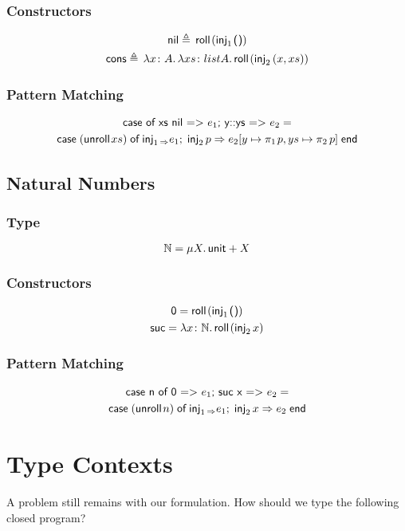 \documentclass{lecturenotes}
\newcommand{\tabs}[3]{\ensuremath{\lambda #1 \colon #2.\,#3}}
\newcommand{\utype}{\textsf{unit}\xspace}
\newcommand{\unit}{\ensuremath{\textsf{(}\mkern0.5mu\textsf{)}}}
\newcommand{\pair}[2]{\ensuremath{(#1, #2)}}
\newcommand{\projl}[1]{\ensuremath{\pi_1\mkern2mu#1}}
\newcommand{\projr}[1]{\ensuremath{\pi_2\mkern3mu#1}}
\newcommand{\sumtype}[2]{\ensuremath{#1 + #2}}
\newcommand{\injl}[1]{\ensuremath{\textsf{inj}_1\mkern2mu#1}}
\newcommand{\injr}[1]{\ensuremath{\textsf{inj}_2\mkern3mu#1}}
\newcommand{\case}[5]{\ensuremath{\textsf{case}\mkern5mu#1\mkern5mu\textsf{of}\mkern5mu\injl{#2} \Rightarrow #3;\mkern5mu\injr{#4} \Rightarrow #5\mkern5mu\textsf{end}}}
\newcommand{\rectype}[2]{\ensuremath{\mu #1.\,#2}}
\newcommand{\roll}[1]{\textsf{roll}\mkern2mu#1}
\newcommand{\unroll}[1]{\textsf{unroll}\mkern2mu#1}
\begin{document}
\subsubsection{Constructors}
\begin{gather*}
  \textsf{nil} \triangleq\, \roll{(\injl{\unit})}\\
  \textsf{cons} \triangleq\, \tabs{x}{A}{\tabs{xs}{list A}{\roll{(\injr{\pair{x}{xs}})}}}
\end{gather*}

\subsubsection{Pattern Matching}

\begin{gather*}
  \textsf{case of xs nil => $e_1$; y::ys => $e_2$} =\\
  \textsf{\case{(\unroll{xs})}{_}{e_1}{p}{e_2[y \mapsto \projl{p}, ys \mapsto \projr{p}]}}
\end{gather*}

\subsection{Natural Numbers}
\subsubsection{Type}

\[
  \mathbb{N} = \textsf{\rectype{X}{\sumtype{\utype}{X}}}
\]

\subsubsection{Constructors}
\begin{gather*}
  \textsf{0} = \roll{(\injl{\unit})}\\
  \textsf{suc} = \tabs{x}{\mathbb{N}}{\roll{(\injr{x})}}
\end{gather*}

\subsubsection{Pattern Matching}
\begin{gather*}
  \textsf{case n of 0 => $e_1$; suc x => $e_2$} =\\
  \textsf{\case{(\unroll{n})}{_}{e_1}{x}{e_2}}
\end{gather*}

\section{Type Contexts}
A problem still remains with our formulation.
How should we type the following closed program?
\end{document}
